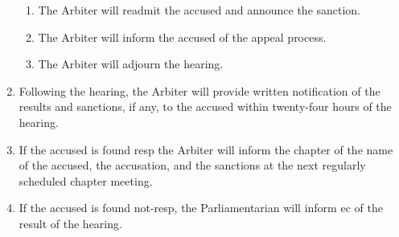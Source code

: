 \begin{enumerate}
\begin{enumerate}
				\item The Arbiter will readmit the accused and announce the sanction.
				\item The Arbiter will inform the accused of the appeal process.
				\item The Arbiter will adjourn the hearing.
			\end{enumerate}

		\item Following the hearing, the Arbiter will provide written notification of the results and sanctions, if any, to the accused within twenty-four hours of the hearing.
		\item If the accused is found \gls{resp} the Arbiter will inform the chapter of the name of the accused, the accusation, and the sanctions at the next regularly scheduled chapter meeting.
		\item If the accused is found \gls{not-resp}, the Parliamentarian will inform \gls{ec} of the result of the hearing.

	\end{enumerate}

